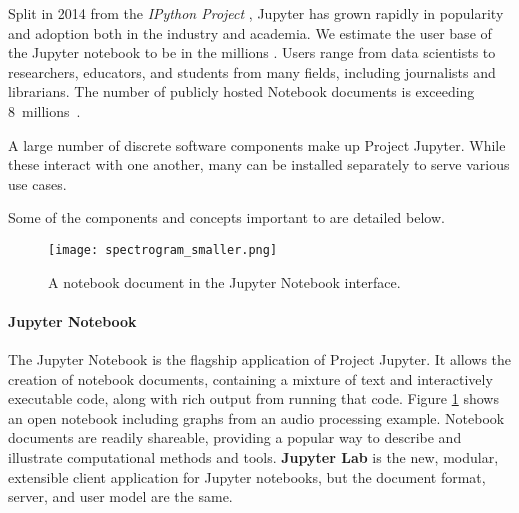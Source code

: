 Split in 2014 from the \emph{IPython Project} \cite{IPython}, Jupyter has grown
rapidly in popularity and adoption both in the industry and academia. We
estimate the user base of the Jupyter notebook to be in the millions
\cite{jupyter-grant}. Users range from data scientists to researchers,
educators, and students from many fields, including journalists and librarians.
The number of publicly hosted Notebook documents is exceeding 8~millions~\cite{notebookcount}.

%

A large number of discrete software components make up Project Jupyter.
While these interact with one another, many can be installed separately
to serve various use cases.


Some of the components and concepts important to \TheProject are detailed below.

\begin{figure}[ht]\centering
  \centering
  \texttt{[image: spectrogram\_smaller.png]}
  \caption{A notebook document in the Jupyter Notebook interface.}\label{fig:notebook-screenshot}
\end{figure}

\paragraph{Jupyter Notebook}\label{sec:jupyter-notebook} The Jupyter Notebook is
the flagship application of Project Jupyter. 
It allows the creation of notebook documents, containing a mixture of text and
interactively executable code, along with rich output from running that code.
Figure \ref{fig:notebook-screenshot} shows an open notebook including graphs
from an audio processing example. Notebook documents are readily shareable,
providing a popular way to describe and illustrate computational methods and
tools.  \textbf{Jupyter Lab} is the new, modular, extensible
client application for Jupyter notebooks, but the document format, server, and
user model are the same.


